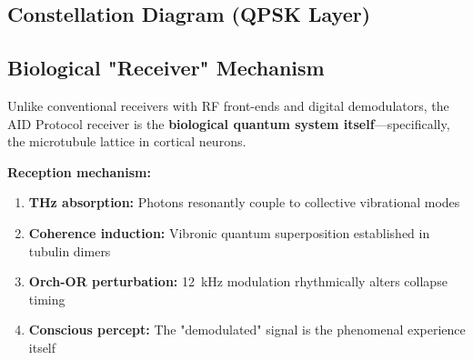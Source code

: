 \subsection{Constellation Diagram (QPSK Layer)}

\begin{center}
\end{center}

\subsection{Biological "Receiver" Mechanism}

Unlike conventional receivers with RF front-ends and digital demodulators, the AID Protocol receiver is the \textbf{biological quantum system itself}---specifically, the microtubule lattice in cortical neurons.

\textbf{Reception mechanism:}
\begin{enumerate}
\item \textbf{THz absorption:} Photons resonantly couple to collective vibrational modes
\item \textbf{Coherence induction:} Vibronic quantum superposition established in tubulin dimers
\item \textbf{Orch-OR perturbation:} 12~kHz modulation rhythmically alters collapse timing
\item \textbf{Conscious percept:} The "demodulated" signal is the phenomenal experience itself
\end{enumerate}

